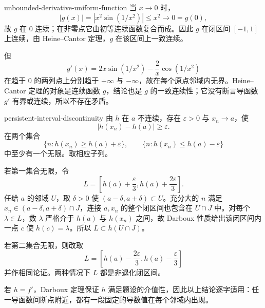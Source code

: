 \begin{solution}{unbounded-derivative-uniform-function}
当 \(x\to0\) 时，
\[
 |g(x)|=|x^2\sin(1/x^2)|\le x^2\longrightarrow0=g(0),
\]
故 \(g\) 在 \(0\) 连续；在非零点它由初等连续函数复合而成。因此 \(g\) 在闭区间 \([-1,1]\) 上连续，由 Heine--Cantor 定理，\(g\) 在该区间上一致连续。

但
\[
 g'(x)=2x\sin(1/x^2)-\frac2x\cos(1/x^2)
\]
在趋于 \(0\) 的两列点上分别趋于 \(+\infty\) 与 \(-\infty\)，故在每个原点邻域内无界。Heine--Cantor 定理的对象是连续函数 \(g\)，结论也是 \(g\) 的一致连续性；它没有断言导函数 \(g'\) 有界或连续，所以不存在矛盾。
\end{solution}

\begin{solution}{persistent-interval-discontinuity}
由 \(h\) 在 \(a\) 不连续，存在 \(\varepsilon>0\) 与 \(x_n\to a\)，使
\[
 |h(x_n)-h(a)|\ge\varepsilon.
\]
在两个集合
\[
 \{n:h(x_n)\ge h(a)+\varepsilon\},
 \qquad
 \{n:h(x_n)\le h(a)-\varepsilon\}
\]
中至少有一个无限。取相应子列。

若第一集合无限，令
\[
 L=\left[h(a)+\frac{\varepsilon}{3},
          h(a)+\frac{2\varepsilon}{3}\right].
\]
任给 \(a\) 的邻域 \(U\)，取 \(\delta>0\) 使 \((a-\delta,a+\delta)\subset U\)。充分大的 \(n\) 满足 \(x_n\in(a-\delta,a+\delta)\cap J\)，连接 \(a,x_n\) 的整个闭区间也包含在 \(U\cap J\) 中。对每个 \(\lambda\in L\)，数 \(\lambda\) 严格介于 \(h(a)\) 与 \(h(x_n)\) 之间，故 Darboux 性质给出该闭区间内一点 \(c\) 使 \(h(c)=\lambda\)。所以 \(L\subset h(U\cap J)\)。

若第二集合无限，则改取
\[
 L=\left[h(a)-\frac{2\varepsilon}{3},
          h(a)-\frac{\varepsilon}{3}\right]
\]
并作相同论证。两种情况下 \(L\) 都是非退化闭区间。

若 \(h=f'\)，Darboux 定理保证 \(h\) 满足题设的介值性，因此以上结论逐字适用：任一导函数间断点附近，都有一段固定的导数值在每个邻域内出现。
\end{solution}
